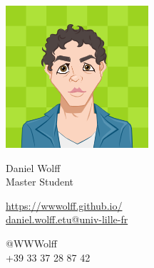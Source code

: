 \documentclass{article}
\begin{document}
\centering \includegraphics[width=.25\linewidth]{AvatarMaker}\\[5pt]
\parbox{2in}{\Large \centering Daniel Wolff\\[1pt]
\normalsize Master Student}

\vfill
\raggedright
\begin{multicols}{2}
\href{https://wwwolff.github.io/}{https://wwwolff.github.io/}\\
\href{mailto:me@john.doe}{daniel.wolff.etu@univ-lille-fr}

\columnbreak
\raggedleft
@WWWolff\\
+39 33 37 28 87 42
\end{multicols}
\end{document}
